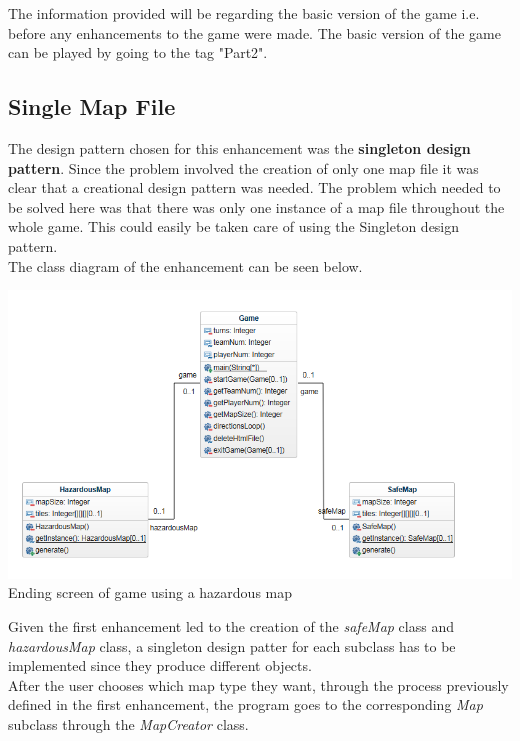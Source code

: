 \documentclass[a4paper,12pt]{extarticle}
\begin{document}
The information provided will be regarding the basic version of the game i.e. before any enhancements to the game were made. The basic version of the game can be played by going to the tag "Part2".

\newpage
\subsection{Single Map File}

The design pattern chosen for this enhancement was the \textbf{singleton design pattern}. Since the problem involved the creation of only one map file it was clear that a creational design pattern was needed. The problem which needed to be solved here was that there was only one instance of a map file throughout the whole game. This could easily be taken care of using the Singleton design pattern.\\

The class diagram of the enhancement can be seen below.\\

\begin{center}
\includegraphics[scale=0.5]{Enhancement2CD.png}\\
Ending screen of game using a hazardous map
\end{center}

\noindent Given the first enhancement led to the creation of the \textit{safeMap} class and \textit{hazardousMap} class, a singleton design patter for each subclass has to be implemented since they produce different objects.\\

\noindent After the user chooses which map type they want, through the process previously defined in the first enhancement, the program goes to the corresponding \textit{Map} subclass through the \textit{MapCreator} class.\\ 
\end{document}
